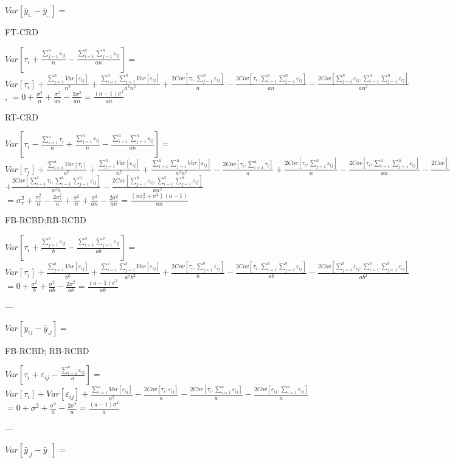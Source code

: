 \documentclass[10pt,portrait]{article}
\begin{document}
$Var[\bar y_{i.}-\bar y_{..}]=$

FT-CRD

$Var[\tau_{i}+\frac{\sum_{j=1}^nε_{ij}}n-\frac{\sum_{i=1}^a\sum_{j=1}^nε_{ij}}{an}]=$
$Var[\tau_{i}]+\frac{\sum_{j=1}^nVar[ε_{ij}]}{n^2}+\frac{\sum_{i=1}^a\sum_{j=1}^nVar[ε_{ij}]}{a^2n^2}+\frac{2Cov[\tau_{i},\sum_{j=1}^nε_{ij}]}{n}-\frac{2Cov[\tau_{i},\sum_{i=1}^a\sum_{j=1}^nε_{ij}]}{an}-\frac{2Cov[\sum_{j=1}^nε_{ij},\sum_{i=1}^a\sum_{j=1}^nε_{ij}]}{an^2}$,
$=0+\frac{\sigma^2}{n}+\frac{\sigma^2}{an}-\frac{2\sigma^2}{an}=\frac{(a-1)\sigma^2}{an}$

RT-CRD

$Var[\tau_{i}-\frac{\sum_{i=1}^a\tau_{i}}{a}+\frac{\sum_{j=1}^nε_{ij}}n-\frac{\sum_{i=1}^a\sum_{j=1}^nε_{ij}}{an}]=$
$Var[\tau_{i}]+\frac{\sum_{i=1}^aVar[\tau_{i}]}{a^2}+\frac{\sum_{j=1}^nVar[ε_{ij}]}{n^2}+\frac{\sum_{i=1}^a\sum_{j=1}^nVar[ε_{ij}]}{a^2n^2}-\frac{2Cov[\tau_{i},\sum_{i=1}^a\tau_{i}]}a+\frac{2Cov[\tau_{i},\sum_{j=1}^nε_{ij}]}n-\frac{2Cov[\tau_{i},\sum_{i=1}^a\sum_{j=1}^nε_{ij}]}{an}-\frac{2Cov[\sum_{i=1}^a\tau_{i},\sum_{j=1}^nε_{ij}]}{an}$
$+\frac{2Cov[\sum_{i=1}^a\tau_{i},\sum_{i=1}^a\sum_{j=1}^nε_{ij}]}{a^2n}-\frac{2Cov[\sum_{j=1}^nε_{ij},\sum_{i=1}^a\sum_{j=1}^nε_{ij}]}{an^2}$
$=\sigma_{\tau}^2+\frac{\sigma_{\tau}^2}{a}-\frac{2\sigma_{\tau}^2}{a}+\frac{\sigma^2}{n}+\frac{\sigma^2}{an}-\frac{2\sigma^2}{an}=\frac{(n\sigma_{\tau}^2+\sigma^2)(a-1)}{an}$

FB-RCBD;RB-RCBD

$Var[\tau_{i}+\frac{\sum_{j=1}^bε_{ij}}b-\frac{\sum_{i=1}^a\sum_{j=1}^bε_{ij}}{ab}]=$
$Var[\tau_{i}]+\frac{\sum_{j=1}^bVar[ε_{ij}]}{b^2}+\frac{\sum_{i=1}^a\sum_{j=1}^bVar[ε_{ij}]}{a^2b^2}+\frac{2Cov[\tau_{i},\sum_{j=1}^bε_{ij}]}{b}-\frac{2Cov[\tau_{i},\sum_{i=1}^a\sum_{j=1}^bε_{ij}]}{ab}-\frac{2Cov[\sum_{j=1}^bε_{ij},\sum_{i=1}^a\sum_{j=1}^bε_{ij}]}{ab^2}$
$=0+\frac{\sigma^2}{b}+\frac{\sigma^2}{ab}-\frac{2\sigma^2}{ab}=\frac{(a-1)\sigma^2}{ab}$

 ---

$Var[y_{ij}-\bar y_{.j}]=$

FB-RCBD; RB-RCBD

$Var[\tau_{i}+ε_{ij}-\frac{\sum_{i=1}^aε_{ij}}a]=$
$Var[\tau_{i}]+Var[ε_{ij}]+\frac{\sum_{i=1}^aVar[ε_{ij}]}{a^2}-\frac{2Cov[\tau_{i},ε_{ij}]}a-\frac{2Cov[\tau_{i},\sum_{i=1}^aε_{ij}]}a-\frac{2Cov[ε_{ij},\sum_{i=1}^aε_{ij}]}a$
$=0+\sigma^2+\frac{\sigma^2}a-\frac{2\sigma^2}a=\frac{(a-1)\sigma^2}a$

 ---

$Var[\bar y_{.j}-\bar y_{..}]=$
\end{document}
